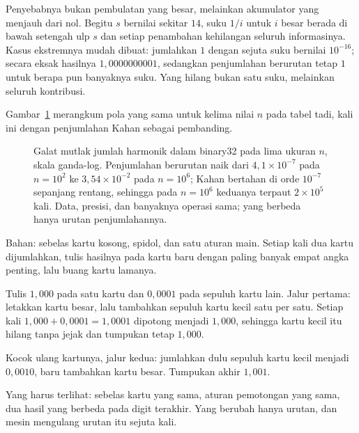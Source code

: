 Penyebabnya bukan pembulatan yang besar, melainkan akumulator yang menjauh dari nol.
Begitu $s$ bernilai sekitar $14$, suku $1/i$ untuk $i$ besar berada di bawah setengah
ulp $s$ dan setiap penambahan kehilangan seluruh informasinya. Kasus ekstremnya mudah
dibuat: jumlahkan $1$ dengan sejuta suku bernilai $10^{-16}$; secara eksak hasilnya
$1{,}0000000001$, sedangkan penjumlahan berurutan tetap $1$ untuk berapa pun banyaknya
suku. Yang hilang bukan satu suku, melainkan seluruh kontribusi.

Gambar~\ref{fig:galatjumlah} merangkum pola yang sama untuk kelima nilai $n$ pada tabel
tadi, kali ini dengan penjumlahan Kahan sebagai pembanding.

\begin{figure}[htbp]
\centering
{}
\caption{Galat mutlak jumlah harmonik dalam binary32 pada lima ukuran $n$, skala
ganda-log. Penjumlahan berurutan naik dari $4{,}1\times10^{-7}$ pada $n=10^{2}$ ke
$3{,}54\times10^{-2}$ pada $n=10^{6}$; Kahan bertahan di orde $10^{-7}$ sepanjang
rentang, sehingga pada $n=10^{6}$ keduanya terpaut $2\times10^{5}$ kali. Data, presisi,
dan banyaknya operasi sama; yang berbeda hanya urutan penjumlahannya.}
\label{fig:galatjumlah}
\end{figure}

\begin{tangan}
Bahan: sebelas kartu kosong, spidol, dan satu aturan main. Setiap kali dua kartu
dijumlahkan, tulis hasilnya pada kartu baru dengan paling banyak empat angka penting,
lalu buang kartu lamanya.

Tulis $1{,}000$ pada satu kartu dan $0{,}0001$ pada sepuluh kartu lain. Jalur pertama:
letakkan kartu besar, lalu tambahkan sepuluh kartu kecil satu per satu. Setiap kali
$1{,}000+0{,}0001=1{,}0001$ dipotong menjadi $1{,}000$, sehingga kartu kecil itu hilang
tanpa jejak dan tumpukan tetap $1{,}000$.

Kocok ulang kartunya, jalur kedua: jumlahkan dulu sepuluh kartu kecil menjadi
$0{,}0010$, baru tambahkan kartu besar. Tumpukan akhir $1{,}001$.

Yang harus terlihat: sebelas kartu yang sama, aturan pemotongan yang sama, dua hasil
yang berbeda pada digit terakhir. Yang berubah hanya urutan, dan mesin mengulang urutan
itu sejuta kali.
\end{tangan}

